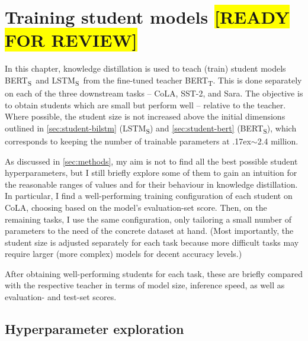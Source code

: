 \documentclass[bsc,frontabs,singlespacing,parskip,deptreport]{infthesis}
\def\mytilde{{\raise.17ex\hbox{$\scriptstyle\sim$}}}
\def\reviewready{\colorbox{yellow}{[READY FOR REVIEW]}}
\def\BERTT{BERT\textsubscript{T}}
\def\BERTS{BERT\textsubscript{S}}
\def\LSTMS{LSTM\textsubscript{S}}
\begin{document}
\chapter{Training student models \reviewready}{
  In this chapter, knowledge distillation is used to teach (train) student models \BERTS~and \LSTMS~from the fine-tuned teacher \BERTT. This is done separately on each of the three downstream tasks -- CoLA, SST-2, and Sara.
  The objective is to obtain students which are small but perform well -- relative to the teacher. Where possible, the student size is not increased above the initial dimensions outlined in \autoref{sec:student-bilstm} (\LSTMS) and \autoref{sec:student-bert} (\BERTS), which corresponds to keeping the number of trainable parameters at \mytilde2.4 million.

  As discussed in \autoref{sec:methods}, my aim is not to find all the best possible student hyperparameters, but I still briefly explore some of them to gain an intuition for the reasonable ranges of values and for their behaviour in knowledge distillation.
  In particular, I find a well-performing training configuration of each student on CoLA, choosing based on the model's evaluation-set score. Then, on the remaining tasks, I use the same configuration, only tailoring a small number of parameters to the need of the concrete dataset at hand. (Most importantly, the student size is adjusted separately for each task because more difficult tasks may require larger (more complex) models for decent accuracy levels.)

  After obtaining well-performing students for each task, these are briefly compared with the respective teacher in terms of model size, inference speed, as well as evaluation- and test-set scores.

  \section{Hyperparameter exploration}{
    \label{sec:hparam-general}

}}
\end{document}
